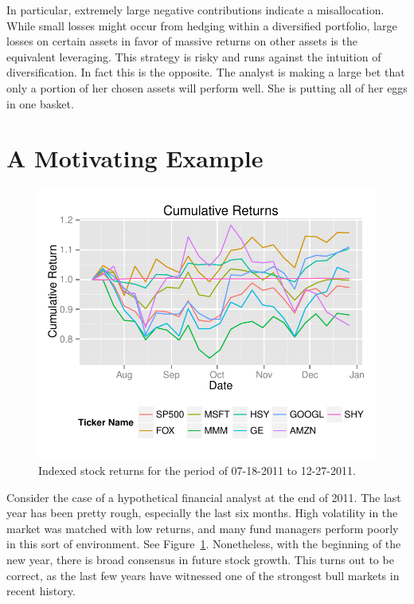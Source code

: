 \documentclass[a4paper]{article}\usepackage[]{graphicx}\usepackage[]{color}
\makeatletter
\def\maxwidth{ %
  \ifdim\Gin@nat@width>\linewidth
    \linewidth
  \else
    \Gin@nat@width
  \fi
}
\newenvironment{knitrout}{}{} %
\makeatother
\begin{document}
In particular, extremely large negative contributions indicate a misallocation. While small losses might occur from hedging within a diversified portfolio, large losses on certain assets in favor of massive returns on other assets is the equivalent leveraging. This strategy is risky and runs against the intuition of diversification. In fact this is the opposite. The analyst is making a large bet that only a portion of her chosen assets will perform well. She is putting all of her eggs in one basket.

\section{A Motivating Example}

\begin{figure}[H]
    \centering
\begin{knitrout}
\color{fgcolor}
\includegraphics[width=\maxwidth]{figure/sixmonth-1} 

\end{knitrout}
    \caption{Indexed stock returns for the period of 07-18-2011 to 12-27-2011.}
    \label{fig:sixmonth}
\end{figure}

Consider the case of a hypothetical financial analyst at the end of 2011. The last year has been pretty rough, especially the last six months. High volatility in the market was matched with low returns, and many fund managers perform poorly in this sort of environment. See Figure~\ref{fig:sixmonth}. Nonetheless, with the beginning of the new year, there is broad consensus in future stock growth. This turns out to be correct, as the last few years have witnessed one of the strongest bull markets in recent history.
\end{document}
